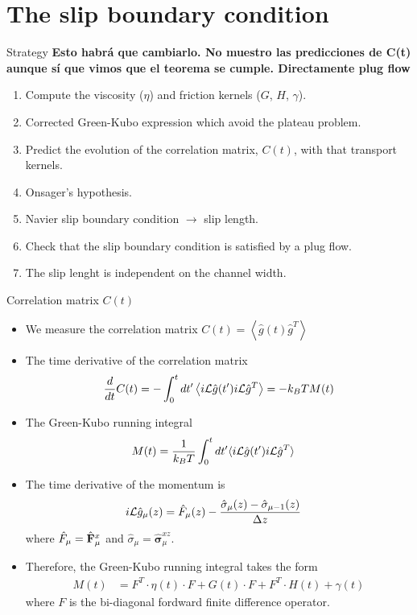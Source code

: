 \documentclass{beamer}
\newcommand{\Note}[1]{{\bf \color{red}#1}}    %
\newcommand{\esc}{\!\cdot\!}
\newcommand{\llangle}{\left\langle}
\newcommand{\rrangle}{\right\rangle}
\begin{document}
\section{The slip boundary condition}
\begin{frame}{Strategy}
  \Note{Esto habrá que cambiarlo. No muestro las predicciones de C(t) aunque sí que vimos que el teorema se cumple. Directamente plug flow}
  \begin{enumerate}
    \item Compute the viscosity ($\eta$) and friction kernels ($G$, $H$, $\gamma$).
    \item Corrected Green-Kubo expression which avoid the plateau problem. 
    \item Predict the evolution of the correlation matrix, $C(t)$, with that transport kernels. 
    \item Onsager's hypothesis.  
    \item Navier slip boundary condition $\rightarrow$ slip length. 
    \item Check that the slip boundary condition is satisfied by a plug flow.
    \item The slip lenght is independent on the channel width.
  \end{enumerate}
\end{frame}

\begin{frame}{Correlation matrix $C(t)$}
  \begin{itemize}
    \item We measure the correlation matrix $C(t)=\llangle \hat{g}(t) \hat{g}^T \rrangle$
\item  The time derivative of the correlation matrix
\begin{align}
  \frac{d}{dt}C(t)
=-  \int_0^t dt' \llangle i{\cal L}\hat{g}(t') i{\cal L}\hat{g}^T\rrangle
=-  k_BT M(t)
\nonumber
\end{align}
\item The Green-Kubo running integral 
\begin{align}
M(t)&= \frac{1}{k_BT}\int_0^t dt'\langle i{\cal L}\hat{g}(t')i{\cal L} \hat{g}^T\rangle
\nonumber
\end{align}
\item The time derivative of the momentum is 
\begin{align}
  i{\cal L}\hat{g}_\mu(z) &=\hat{F}_\mu(z)-\frac{\hat{\sigma}_\mu(z)-\hat{\sigma}_{\mu-1}(z)}{\Delta z}
\nonumber
\end{align}
where
$\hat{F}_\mu=\hat{\bf                   F}_\mu^x$                  and
$\hat{\sigma}_\mu=\hat{\boldsymbol{\sigma}}^{xz}_\mu$.
\item Therefore, the Green-Kubo running integral takes the form  
\begin{align}
{M}(t)&=F^T\esc{\eta}(t)\esc F+{G}(t)\esc F+F^T\esc{H}(t)+{\gamma}(t)
\nonumber
\end{align}
where $F$ is the bi-diagonal fordward finite difference operator.
  \end{itemize}
\end{frame}
\end{document}
